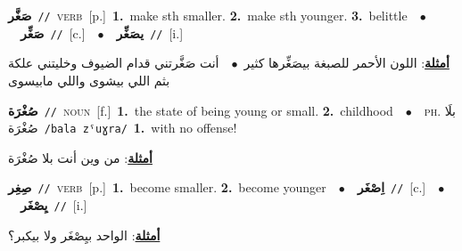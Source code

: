\documentclass[10pt,a4paper,twoside]{article} %
\begin{document}
\begin{multicols}{2}
{\setlength\topsep{0pt}\textbf{\foreignlanguage{arabic}{صَغَّر}}\ {\color{gray}\texttt{//}\color{black}}\ \textsc{verb}\ [p.]\ \textbf{1.}~make sth smaller.  \textbf{2.}~make sth younger.  \textbf{3.}~belittle\ \ $\bullet$\ \ \setlength\topsep{0pt}\textbf{\foreignlanguage{arabic}{صَغِّر}}\ {\color{gray}\texttt{//}\color{black}}\ [c.]\ \ $\bullet$\ \ \setlength\topsep{0pt}\textbf{\foreignlanguage{arabic}{يصَغِّر}}\ {\color{gray}\texttt{//}\color{black}}\ [i.]\  \begin{flushright}\color{gray}\foreignlanguage{arabic}{\textbf{\underline{\foreignlanguage{arabic}{أمثلة}}}: اللون الأحمر للصبغة بيصَغِّرها كثير\ $\bullet$\ \  أنت صَغَّرتني قدام الضيوف وخليتني علكة بثم اللي بيشوى واللي مابيسوى}\end{flushright}\color{black}} \vspace{2mm}

{\setlength\topsep{0pt}\textbf{\foreignlanguage{arabic}{صُغْرَة}}\ {\color{gray}\texttt{//}\color{black}}\ \textsc{noun}\ [f.]\ \textbf{1.}~the state of being young or small.  \textbf{2.}~childhood\ \ $\bullet$\ \ \textsc{ph.} \color{gray} \foreignlanguage{arabic}{بلَا صُغْرَة}\color{black}\ {\color{gray}\texttt{/{\sffamily bala zˤuɣra}/}\color{black}}\ \textbf{1.}~with no offense!\  \begin{flushright}\color{gray}\foreignlanguage{arabic}{\textbf{\underline{\foreignlanguage{arabic}{أمثلة}}}: من وين أنت بلا صُغْرَة}\end{flushright}\color{black}} \vspace{2mm}

{\setlength\topsep{0pt}\textbf{\foreignlanguage{arabic}{صِغِر}}\ {\color{gray}\texttt{//}\color{black}}\ \textsc{verb}\ [p.]\ \textbf{1.}~become smaller.  \textbf{2.}~become younger\ \ $\bullet$\ \ \setlength\topsep{0pt}\textbf{\foreignlanguage{arabic}{اِصْغَر}}\ {\color{gray}\texttt{//}\color{black}}\ [c.]\ \ $\bullet$\ \ \setlength\topsep{0pt}\textbf{\foreignlanguage{arabic}{يِصْغَر}}\ {\color{gray}\texttt{//}\color{black}}\ [i.]\  \begin{flushright}\color{gray}\foreignlanguage{arabic}{\textbf{\underline{\foreignlanguage{arabic}{أمثلة}}}: الواحد بيِصْغَر ولا بيكبر؟}\end{flushright}\color{black}} \vspace{2mm}


\end{multicols}
\end{document}
